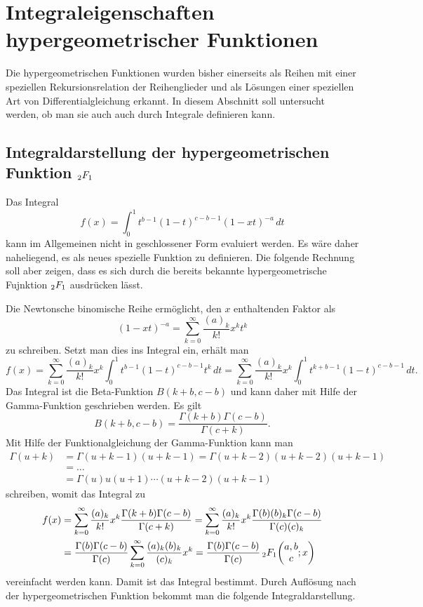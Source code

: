 %
%
%
\section{Integraleigenschaften hypergeometrischer Funktionen
\label{buch:integral:section:eulertransformation}}
Die hypergeometrischen Funktionen wurden bisher einerseits
als Reihen mit einer speziellen Rekursionsrelation der Reihenglieder
und als Lösungen einer speziellen Art von Differentialgleichung
erkannt.
In diesem Abschnitt soll untersucht werden, ob man sie auch
auch durch Integrale definieren kann.

%
%
\subsection{Integraldarstellung der hypergeometrischen Funktion
$\mathstrut_2F_1$}
Das Integral
\[
f(x)
=
\int_0^1 t^{b-1} (1-t)^{c-b-1} (1-xt)^{-a}\,dt
\]
kann im Allgemeinen nicht in geschlossener Form evaluiert werden.
Es wäre daher naheliegend, es als neues spezielle Funktion zu definieren.
Die folgende Rechnung soll aber zeigen, dass es sich durch die bereits
bekannte hypergeometrische Fujnktion $\mathstrut_2F_1$ ausdrücken
lässt.

Die Newtonsche binomische Reihe ermöglicht, den $x$ enthaltenden
Faktor als
\[
(1-xt)^{-a}
=
\sum_{k=0}^\infty
\frac{(a)_k}{k!} x^k t^k
\]
zu schreiben.
Setzt man dies ins Integral ein, erhält man
\[
f(x)
=
\sum_{k=0}^\infty \frac{(a)_k}{k!} x^k
\int_0^1 t^{b-1} (1-t)^{c-b-1} t^k\,dt
=
\sum_{k=0}^\infty \frac{(a)_k}{k!} x^k
\int_0^1 t^{k+b-1} (1-t)^{c-b-1}\,dt.
\]
Das Integral ist die Beta-Funktion $B(k+b,c-b)$ und kann daher mit Hilfe
der Gamma-Funktion geschrieben werden.
Es gilt
\[
B(k+b,c-b)
=
\frac{\Gamma(k+b)\Gamma(c-b)}{\Gamma(c+k)}.
\]
Mit Hilfe der Funktionalgleichung der Gamma-Funktion kann man
\begin{align*}
\Gamma(u+k)
&=
\Gamma(u+k-1) (u+k-1)
=
\Gamma(u+k-2) (u+k-2)(u+k-1)
\\
&=
\ldots
\\
&=
\Gamma(u) u(u+1)\cdots(u+k-2)(u+k-1)
\end{align*}
schreiben, womit das Integral zu
\begin{align*}
f(x)
&=
\sum_{k=0}^\infty \frac{(a)_k}{k!} x^k
\frac{\Gamma(k+b)\Gamma(c-b)}{\Gamma(c+k)}
=
\sum_{k=0}^\infty \frac{(a)_k}{k!} x^k
\frac{\Gamma(b)(b)_k\Gamma(c-b)}{\Gamma(c)(c)_k}
\\
&=
\frac{\Gamma(b)\Gamma(c-b)}{\Gamma(c)}
\sum_{k=0}^\infty\frac{(a)_k(b)_k}{(c)_k} x^k
=
\frac{\Gamma(b)\Gamma(c-b)}{\Gamma(c)}\,
\mathstrut_2F_1\biggl(\begin{matrix}a,b\\c\end{matrix};x\biggr)
\end{align*}
vereinfacht werden kann.
Damit ist das Integral bestimmt. 
Durch Auflösung nach der hypergeometrischen Funktion bekommt man
die folgende Integraldarstellung.

